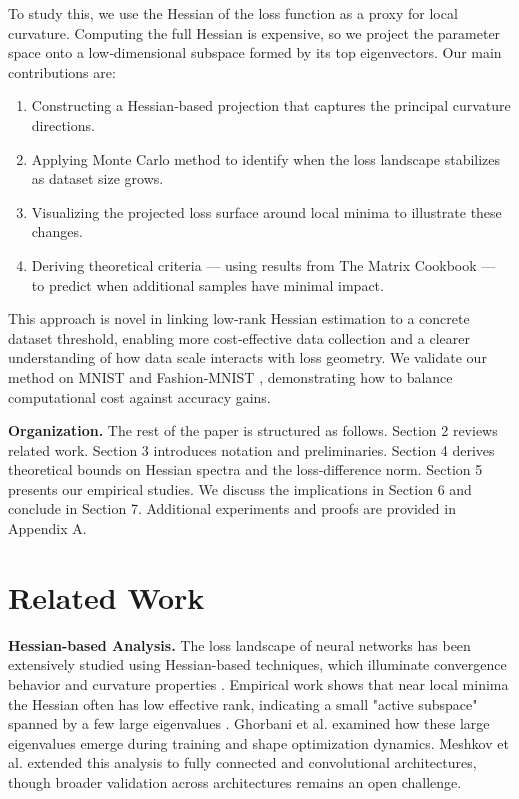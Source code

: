 \documentclass{article}
\begin{document}
To study this, we use the Hessian of the loss function as a proxy for local curvature. Computing the full Hessian is expensive, so we
project the parameter space onto a low‑dimensional subspace formed by its top eigenvectors. Our main contributions are:

\begin{enumerate}
  \item Constructing a Hessian‑based projection that captures the principal curvature directions.
  \item Applying Monte Carlo method to identify when the loss landscape stabilizes as dataset size grows.
  \item Visualizing the projected loss surface around local minima to illustrate these changes.
  \item Deriving theoretical criteria --- using results from The Matrix Cookbook \cite{petersen2012matrix} --- to predict when additional
        samples have minimal impact.
\end{enumerate}

This approach is novel in linking low‑rank Hessian estimation to a concrete dataset threshold, enabling more cost‑effective data
collection and a clearer understanding of how data scale interacts with loss geometry. We validate our method on MNIST
\cite{deng2012mnist} and Fashion‑MNIST \cite{xiao2017fashion}, demonstrating how to balance computational cost against accuracy gains.

\textbf{Organization.} The rest of the paper is structured as follows. Section 2 reviews related work. Section 3 introduces notation
and preliminaries. Section 4 derives theoretical bounds on Hessian spectra and the loss‐difference norm. Section 5 presents our
empirical studies. We discuss the implications in Section 6 and conclude in Section 7. Additional experiments and proofs are
provided in Appendix A.


\section{Related Work}\label{sec:rw}

\textbf{Hessian-based Analysis.}
The loss landscape of neural networks has been extensively studied using Hessian-based techniques, which illuminate convergence
behavior and curvature properties \cite{kiselev2024unraveling}. Empirical work shows that near local minima the Hessian often has low
effective rank, indicating a small "active subspace" spanned by a few large eigenvalues \cite{sagun2018empirical}. Ghorbani et al.
\cite{ghorbani2019investigation} examined how these large eigenvalues emerge during training and shape optimization dynamics.
Meshkov et al. \cite{meshkov2024convnets} extended this analysis to fully connected and convolutional architectures, though broader
validation across architectures remains an open challenge.
\end{document}
